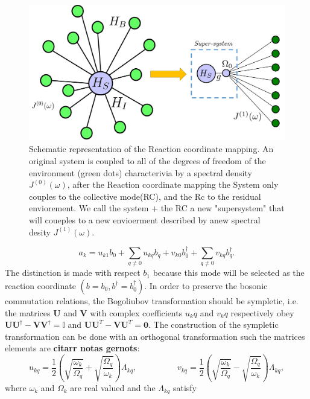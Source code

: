 \documentclass[%
preprint,
onecolumn,
notitlepag,
 amsmath,amssymb,
 aps,
 pra,
]{revtex4-2}
\begin{document}
\begin{itemize}
\begin{figure}[!h]
\centering
\includegraphics[width=0.9\linewidth]{Images/Rc_mapping_skecth.png}
\caption{Schematic representation of the Reaction coordinate mapping.  An original system is coupled to all of the degrees of freedom of the environment (green dots) characterivia by  a spectral density $J^{(0)}(\omega)$, after the Reaction coordinate mapping the System only couples to the collective mode(RC), and the Rc to the residual enviorement. We call the system $+$ the RC a new "supersystem" that will coueples to a new envioerment described by anew spectral desity $J^{(1)}(\omega)$. }
\label{Rc_mapping_skecth}
\end{figure}

\begin{equation}
   a_k = u_{k1} b_0 +\sum_{q\neq 0} u_{kq} b_q + v_{k0} b_0^{\dagger}+ \sum_{q\neq 0} v_{kq} b_q^{\dagger}.
\end{equation}
The distinction is made with respect $b_1$ because this mode will be selected as the reaction coordinate $(b=b_0 , b^{\dagger} = b^{\dagger}_0 )$. In order to preserve the bosonic commutation relations, the Bogoliubov transformation should be sympletic, i.e. the matrices $\mathbf{U}$  and $ \mathbf{V}$ with complex coefficients $u_kq$ and  $v_kq$ respectively obey  $\mathbf{U}\mathbf{U}^{\dagger}- \mathbf{V}\mathbf{V}^{\dagger}= \mathbb{I}$ and $\mathbf{U}\mathbf{U}^T-\mathbf{V}\mathbf{U}^T= \mathbf{0} $. The construction of the sympletic transformation can be done with an orthogonal transformation such the matrices elements are \textbf{citarr notas gernots}:
\begin{equation}
    u_{kq} = \frac{1}{2} \left( \sqrt{ \frac{\omega_k}{\Omega_q}} + \sqrt{ \frac{\Omega_q}{\omega_k}}  \right) \Lambda_{kq}, \hspace{2cm}  v_{kq} = \frac{1}{2} \left( \sqrt{ \frac{\omega_k}{\Omega_q}} - \sqrt{ \frac{\Omega_q}{\omega_k}}  \right) \Lambda_{kq},
\label{orthogonal}
\end{equation}
where $\omega_k$ and $\Omega_k$ are real valued and the $\Lambda_{kq}$ satisfy


\end{itemize}
\end{document}
